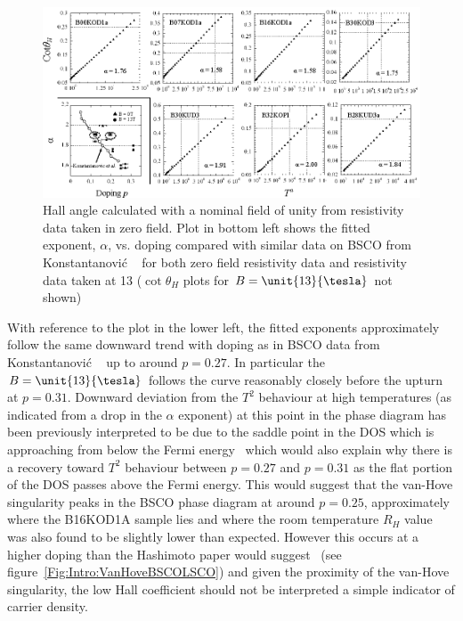\begin{figure}[htbp]
    \begin{center}
        \includegraphics[scale=1.0]{Chapter-HallBSCO/Figures/HallAngle/HallAngle}
        \caption{Hall angle calculated with a nominal field of unity from resistivity data taken in zero field. Plot in bottom left shows the fitted exponent, $\alpha$, vs. doping compared with similar data on \ac{BSCO} from Konstantanovi\'c \etal~\cite{Konstantinovic2000} for both zero field resistivity data and resistivity data taken at \unit{13}{\kelvin} ($\cot\theta_H$ plots for $B=\unit{13}{\tesla}$ not shown)}
        \label{Fig:ResH:HallAngle}
    \end{center}
\end{figure}
With reference to the plot in the lower left, the fitted exponents approximately follow the same downward trend with doping as in \ac{BSCO} data from Konstantanovi\'c \etal~\cite{Konstantinovic2000} up to around $p=0.27$. In particular the $B=\unit{13}{\tesla}$ follows the curve reasonably closely before the upturn at $p=0.31$. Downward deviation from the $T^2$ behaviour at high temperatures (as indicated from a drop in the $\alpha$ exponent) at this point in the phase diagram has been previously interpreted to be due to the saddle point in the \ac{DOS} which is approaching from below the Fermi energy~\cite{Ando2004} which would also explain why there is a recovery toward $T^2$ behaviour between $p=0.27$ and $p=0.31$ as the flat portion of the \ac{DOS} passes above the Fermi energy. This would suggest that the van-Hove singularity peaks in the \ac{BSCO} phase diagram at around $p=0.25$, approximately where the B16KOD1A sample lies and where the room temperature $R_H$ value was also found to be slightly lower than expected. However this occurs at a higher doping than the Hashimoto paper would suggest~\cite{Hashimoto2008} (see figure~\ref{Fig:Intro:VanHoveBSCOLSCO}) and given the proximity of the van-Hove singularity, the low Hall coefficient should not be interpreted a simple indicator of carrier density. 
